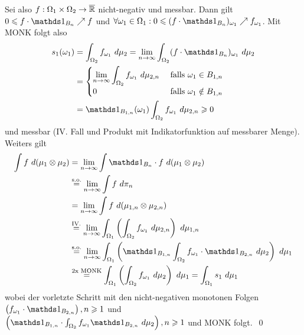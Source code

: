 \documentclass[11pt]{report}
\begin{document}
    Sei also $f:\Omega_1\times\Omega_2\to\overline{\mathbb{R}}$ nicht-negativ und messbar. Dann gilt $0\leq f\cdot\ind{B_n}\nearrow f$ und $\forall\omega_1\in\Omega_1:0\leq(f\cdot\ind{B_n})_{\omega_1}\nearrow f_{\omega_1}$. Mit MONK folgt also
    \begin{align*}
        s_1(\omega_1)&=\int_{\Omega_2}f_{\omega_1}\ d\mu_2=\lim_{n\to\infty}\int_{\Omega_2}(f\cdot\ind{B_n})_{\omega_1}\ d\mu_2\\
        &=\begin{cases}
            \displaystyle\lim_{n\to\infty}\int_{\Omega_2}f_{\omega_1}\ d\mu_{2,n}&\text{ falls }\omega_1\in B_{1,n}\\
            0&\text{ falls }\omega_1\notin B_{1,n}
        \end{cases}
        \\ &=\ind{B_{1,n}}(\omega_1)\int_{\Omega_2}f_{\omega_1}\ d\mu_{2,n}\geq0
    \end{align*}
    und messbar (IV. Fall und Produkt mit Indikatorfunktion auf messbarer Menge). Weiters gilt
    \begin{align*}
        \int f\ d(\mu_1\otimes\mu_2)&=\lim_{n\to\infty}\int\ind{B_n}\cdot f\ d(\mu_1\otimes\mu_2)\\
        &\overset{\text{s.o.}}{=}\lim_{n\to\infty}\int f\ d\pi_n\\
        &=\lim_{n\to\infty}\int f\ d(\mu_{1,n}\otimes\mu_{2,n})\\
        &\overset{\text{IV.}}{=}\lim_{n\to\infty}\int_{\Omega_1}\left(\int_{\Omega_2} f_{\omega_1}\ d\mu_{2,n}\right)\ d\mu_{1,n}\\
        &\overset{\text{s.o.}}{=}\lim_{n\to\infty}\int_{\Omega_1}\left(\ind{B_{1,n}}\int_{\Omega_2}f_{\omega_1}\cdot\ind{B_{2,n}}\ d\mu_2\right)\ d\mu_1 \\
        &\overset{\text{2x MONK}}{=}\int_{\Omega_1}\left(\int_{\Omega_2}f_{\omega_1}\ d\mu_2\right)\ d\mu_1=\int_{\Omega_1}s_1\ d\mu_1
    \end{align*}
    wobei der vorletzte Schritt mit den nicht-negativen monotonen Folgen $\left(f_{\omega_1}\cdot\ind{B_{2,n}}\right),n\geq1$ und 
    $\left(\ind{B_{1,n}}\cdot\int_{\Omega_2}f_{\omega_1}\ind{B_{2,n}}\ d\mu_2\right),n\geq1$
    und MONK folgt. \qed
    
\end{document}
